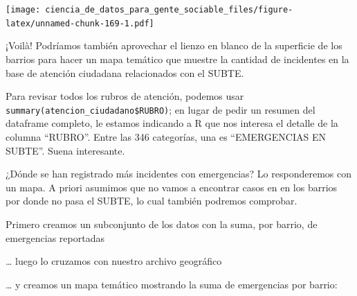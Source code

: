 \documentclass[]{book}
\newenvironment{Shaded}{\begin{snugshade}}{\end{snugshade}}
\newcommand{\KeywordTok}[1]{\textcolor[rgb]{0.13,0.29,0.53}{\textbf{#1}}}
\newcommand{\DataTypeTok}[1]{\textcolor[rgb]{0.13,0.29,0.53}{#1}}
\newcommand{\StringTok}[1]{\textcolor[rgb]{0.31,0.60,0.02}{#1}}
\newcommand{\OperatorTok}[1]{\textcolor[rgb]{0.81,0.36,0.00}{\textbf{#1}}}
\newcommand{\NormalTok}[1]{#1}
\begin{document}
\texttt{[image: ciencia\_de\_datos\_para\_gente\_sociable\_files/figure-latex/unnamed-chunk-169-1.pdf]}

¡Voilà! Podríamos también aprovechar el lienzo en blanco de la
superficie de los barrios para hacer un mapa temático que muestre la
cantidad de incidentes en la base de atención ciudadana relacionados con
el SUBTE.

Para revisar todos los rubros de atención, podemos usar
\texttt{summary(atencion\_ciudadano\$RUBRO)}; en lugar de pedir un
resumen del dataframe completo, le estamos indicando a R que nos
interesa el detalle de la columna ``RUBRO''. Entre las 346 categorías,
una es ``EMERGENCIAS EN SUBTE''. Suena interesante.

¿Dónde se han registrado más incidentes con emergencias? Lo
responderemos con un mapa. A priori asumimos que no vamos a encontrar
casos en en los barrios por donde no pasa el SUBTE, lo cual también
podremos comprobar.

Primero creamos un subconjunto de los datos con la suma, por barrio, de
emergencias reportadas

\begin{Shaded}
\end{Shaded}

\ldots{} luego lo cruzamos con nuestro archivo geográfico

\begin{Shaded}
\end{Shaded}

\ldots{} y creamos un mapa temático mostrando la suma de emergencias por
barrio:
\end{document}
